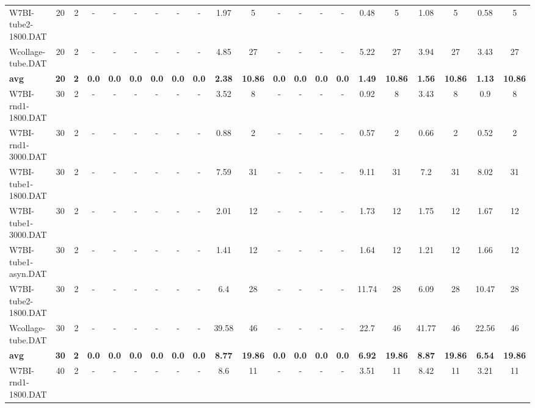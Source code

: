 \begin{sidewaystable}[!ht]
{\begin{tabular}{lcccccccccccccccccccc}
W7BI-tube2-1800.DAT & 20 & 2 &  - &  - &  - &  - &  - &  - & 1.97 & 5 &  - &  - &  - &  - &  \textcolor{blue2}{0.48} & 5 & 1.08 & 5 & 0.58 & 5 \\
Wcollage-tube.DAT & 20 & 2 &  - &  - &  - &  - &  - &  - & 4.85 & 27 &  - &  - &  - &  - & 5.22 & 27 & 3.94 & 27 &  \textcolor{blue2}{3.43} & 27 \\
\cline{1-21} \textbf{avg} & \textbf{20} & \textbf{2} & \textbf{0.0} & \textbf{0.0} & \textbf{0.0} & \textbf{0.0} & \textbf{0.0} & \textbf{0.0} & \textbf{2.38} & \textbf{10.86} & \textbf{0.0} & \textbf{0.0} & \textbf{0.0} & \textbf{0.0} & \textbf{1.49} & \textbf{10.86} & \textbf{1.56} & \textbf{10.86} & \textbf{1.13} & \textbf{10.86} \\ \cline{1-21}
W7BI-rnd1-1800.DAT & 30 & 2 &  - &  - &  - &  - &  - &  - & 3.52 & 8 &  - &  - &  - &  - & 0.92 & 8 & 3.43 & 8 &  \textcolor{blue2}{0.9} & 8 \\
W7BI-rnd1-3000.DAT & 30 & 2 &  - &  - &  - &  - &  - &  - & 0.88 & 2 &  - &  - &  - &  - & 0.57 & 2 & 0.66 & 2 &  \textcolor{blue2}{0.52} & 2 \\
W7BI-tube1-1800.DAT & 30 & 2 &  - &  - &  - &  - &  - &  - & 7.59 & 31 &  - &  - &  - &  - & 9.11 & 31 &  \textcolor{blue2}{7.2} & 31 & 8.02 & 31 \\
W7BI-tube1-3000.DAT & 30 & 2 &  - &  - &  - &  - &  - &  - & 2.01 & 12 &  - &  - &  - &  - & 1.73 & 12 & 1.75 & 12 &  \textcolor{blue2}{1.67} & 12 \\
W7BI-tube1-asyn.DAT & 30 & 2 &  - &  - &  - &  - &  - &  - & 1.41 & 12 &  - &  - &  - &  - & 1.64 & 12 &  \textcolor{blue2}{1.21} & 12 & 1.66 & 12 \\
W7BI-tube2-1800.DAT & 30 & 2 &  - &  - &  - &  - &  - &  - & 6.4 & 28 &  - &  - &  - &  - & 11.74 & 28 &  \textcolor{blue2}{6.09} & 28 & 10.47 & 28 \\
Wcollage-tube.DAT & 30 & 2 &  - &  - &  - &  - &  - &  - & 39.58 & 46 &  - &  - &  - &  - & 22.7 & 46 & 41.77 & 46 &  \textcolor{blue2}{22.56} & 46 \\
\cline{1-21} \textbf{avg} & \textbf{30} & \textbf{2} & \textbf{0.0} & \textbf{0.0} & \textbf{0.0} & \textbf{0.0} & \textbf{0.0} & \textbf{0.0} & \textbf{8.77} & \textbf{19.86} & \textbf{0.0} & \textbf{0.0} & \textbf{0.0} & \textbf{0.0} & \textbf{6.92} & \textbf{19.86} & \textbf{8.87} & \textbf{19.86} & \textbf{6.54} & \textbf{19.86} \\ \cline{1-21}
W7BI-rnd1-1800.DAT & 40 & 2 &  - &  - &  - &  - &  - &  - & 8.6 & 11 &  - &  - &  - &  - & 3.51 & 11 & 8.42 & 11 &  \textcolor{blue2}{3.21} & 11 \\

\end{tabular}}
\end{sidewaystable}
